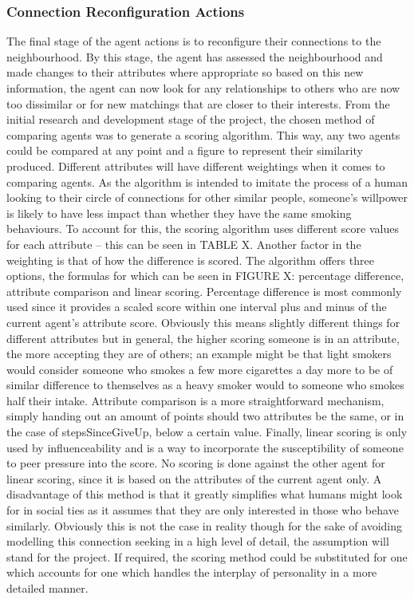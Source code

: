 \documentclass[]{report}
\begin{document}
\subsubsection{Connection Reconfiguration Actions}
The final stage of the agent actions is to reconfigure their connections to the neighbourhood. By this stage, the agent has assessed the neighbourhood and made changes to their attributes where appropriate so based on this new information, the agent can now look for any relationships to others who are now too dissimilar or for new matchings that are closer to their interests. From the initial research and development stage of the project, the chosen method of comparing agents was to generate a scoring algorithm. This way, any two agents could be compared at any point and a figure to represent their similarity produced. 
Different attributes will have different weightings when it comes to comparing agents. As the algorithm is intended to imitate the process of a human looking to their circle of connections for other similar people, someone's willpower is likely to have less impact than whether they have the same smoking behaviours. To account for this, the scoring algorithm uses different score values for each attribute – this can be seen in TABLE X. Another factor in the weighting is that of how the difference is scored. The algorithm offers three options, the formulas for which can be seen in FIGURE X: percentage difference, attribute comparison and linear scoring. 
Percentage difference is most commonly used since it provides a scaled score within one interval plus and minus of the current agent's attribute score. Obviously this means slightly different things for different attributes but in general, the higher scoring someone is in an attribute, the more accepting they are of others; an example might be that light smokers would consider someone who smokes a few more cigarettes a day more to be of similar difference to themselves as a heavy smoker would to someone who smokes half their intake. Attribute comparison is a more straightforward mechanism, simply handing out an amount of points should two attributes be the same, or in the case of stepsSinceGiveUp, below a certain value. Finally, linear scoring is only used by influenceability and is a way to incorporate the susceptibility of someone to peer pressure into the score. No scoring is done against the other agent for linear scoring, since it is based on the attributes of the current agent only. A disadvantage of this method is that it greatly simplifies what humans might look for in social ties as it assumes that they are only interested in those who behave similarly. Obviously this is not the case in reality though for the sake of avoiding modelling this connection seeking in a high level of detail, the assumption will stand for the project. If required, the scoring method could be substituted for one which accounts for one which handles the interplay of personality in a more detailed manner.
\end{document}
